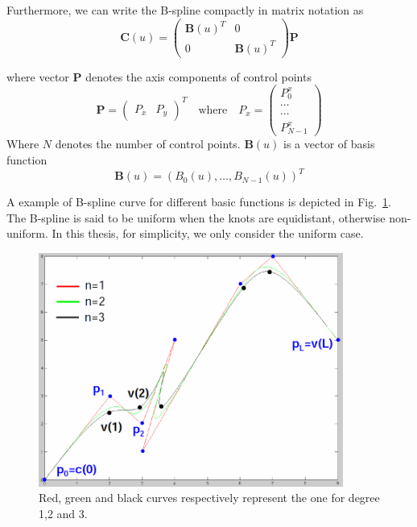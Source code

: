 Furthermore, we can write the B-spline compactly in matrix notation as 
\begin{equation}
  \label{eq:4.3}
  \mathbf{C}(u) = 
  \begin{pmatrix}
\mathbf{B}(u)^T & 0 \\
0 &\mathbf{B}(u)^T
  \end{pmatrix}
\mathbf{P}
\end{equation}

where vector $\mathbf{P}$ denotes the axis components of control
points
\begin{equation}
  \label{eq:4.4}
  \mathbf{P} =
  \begin{pmatrix}
    P_x & P_y    
  \end{pmatrix}^T \quad \mathrm{where} \quad P_x =
  \begin{pmatrix}
    P_0^x\\
    \cdots\\
    \cdots\\
    P_{N-1}^x
  \end{pmatrix}
\end{equation}
Where $N$ denotes the number of control points. $\mathbf{B}(u)$ is a
vector of basis function
\begin{equation}
  \label{eq:4.5}
  \mathbf{B}(u) = (B_0(u), \ldots, B_{N-1}(u))^T
\end{equation}

A example of B-spline curve for different basic functions is depicted
in Fig.~\ref{fig:bspline}. The B-spline is said to be uniform when the knots are equidistant,
otherwise non-uniform. In this thesis, for simplicity, we only
consider the uniform case.
\begin{figure}[htb]
  \centering
  \includegraphics[width=10cm]{images/bspline.png}
  \caption[B-spline curves for different degrees~\cite{contourpanin2011}]{Red, green and black
    curves respectively represent the one for degree 1,2 and 3.}
\label{fig:bspline}
\end{figure}

